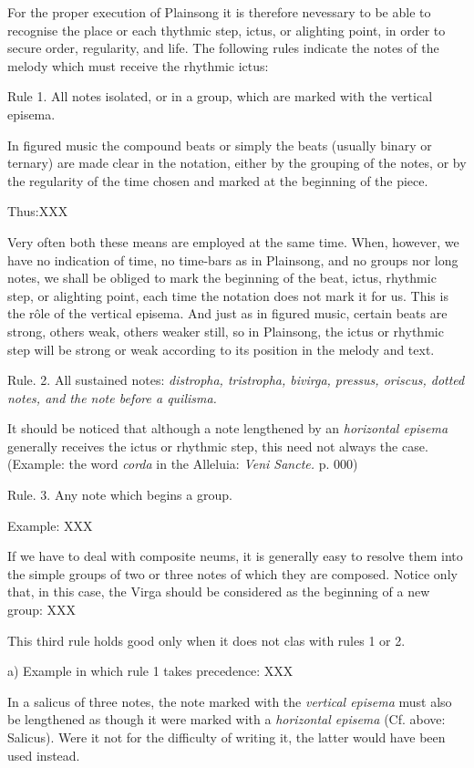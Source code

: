 For the proper execution of Plainsong it is therefore nevessary to be able to recognise the place or each thythmic step, ictus, or alighting point, in order to secure order, regularity, and life. The following rules indicate the notes of the melody which must receive the rhythmic ictus:

Rule 1. All notes isolated, or in a group, which are marked with the vertical episema.

In figured music the compound beats or simply the beats (usually binary or ternary) are made clear in the notation, either by the grouping of the notes, or by the regularity of the time chosen and marked at the beginning of the piece.

Thus:XXX

Very often both these means are employed at the same time. When, however, we have no indication of time, no time-bars as in Plainsong, and no groups nor long notes, we shall be obliged to mark the beginning of the beat, ictus, rhythmic step, or alighting point, each time the notation does not mark it for us. This is the r\^ole of the vertical episema. And just as in figured music, certain beats are strong, others weak, others weaker still, so in Plainsong, the ictus or rhythmic step will be strong or weak according to its position in the melody and text.

Rule. 2. All sustained notes: {\it distropha, tristropha, bivirga, pressus, oriscus, dotted notes, and the note before a quilisma.}

It should be noticed that although a note lengthened by an {\it horizontal episema} generally receives the ictus or rhythmic step, this need not always the case. (Example: the word {\it corda} in the Alleluia: {\it Veni Sancte.} p. 000)

Rule. 3. Any note which begins a group.

Example: XXX

If we have to deal with composite neums, it is generally easy to resolve them into the simple groups of two or three notes of which they are composed. Notice only that, in this case, the Virga should be considered as the beginning of a new group:
XXX

This third rule holds good only when it does not clas with rules 1 or 2.

a) Example in which rule 1 takes precedence:
XXX

In a salicus of three notes, the note marked with the {\it vertical episema} must also be lengthened as though it were marked with a {\it horizontal episema} (Cf. above: Salicus). Were it not for the difficulty of writing it, the latter would have been used instead.

